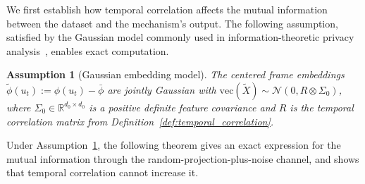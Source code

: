 \documentclass[letterpaper]{article} %
\newtheorem{assumption}[theorem]{Assumption}
\begin{document}
We first establish how temporal correlation affects the mutual
information between the dataset and the mechanism's output.
The following assumption, satisfied by the Gaussian model
commonly used in information-theoretic privacy
analysis~\cite{russo2016controlling,raginsky2016information},
enables exact computation.

\begin{assumption}[Gaussian embedding model]
\label{asm:gaussian}
The centered frame embeddings
$\tilde\phi(u_t) := \phi(u_t) - \bar\phi$ are jointly Gaussian
with $\mathrm{vec}(\tilde X) \sim \mathcal{N}(0, R \otimes \Sigma_0)$,
where $\Sigma_0 \in \mathbb{R}^{d_0 \times d_0}$ is a
positive definite feature covariance and $R$ is the temporal
correlation matrix from Definition~\ref{def:temporal_correlation}.
\end{assumption}

Under Assumption~\ref{asm:gaussian}, the following theorem
gives an exact expression for the mutual information through
the random-projection-plus-noise channel, and shows that
temporal correlation cannot increase it.
\end{document}
